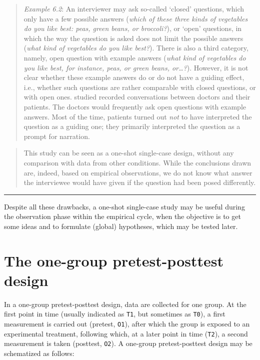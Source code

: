 \documentclass[
]{book}
\begin{document}
\begin{quote}
\emph{Example 6.2}: An interviewer may ask so-called `closed' questions, which only have a few possible answers (\emph{which of these three kinds of vegetables do you like best: peas, green beans, or broccoli?}), or `open' questions, in which the way the question is asked does not limit the possible answers (\emph{what kind of vegetables do you like best?}). There is also a third category, namely, open question with example answers (\emph{what kind of vegetables do you like best, for instance, peas, or green beans, or\ldots?}). However, it is not clear whether these example answers do or do not have a guiding effect, i.e., whether such questions are rather comparable with closed questions, or with open ones. \citet{Houtk91} studied recorded conversations between doctors and their patients. The doctors would frequently ask open questions with example answers. Most of the time, patients turned out \emph{not} to have interpreted the question as a guiding one; they primarily interpreted the question as a prompt for narration.
\end{quote}

\begin{quote}
This study can be seen as a one-shot single-case design, without any comparison with data from other conditions. While the conclusions drawn are, indeed, based on empirical observations, we do not know what answer the interviewee would have given if the question had been posed differently.
\end{quote}

\begin{center}\rule{0.5\linewidth}{0.5pt}\end{center}

Despite all these drawbacks, a one-shot single-case study may be useful during the observation phase within the empirical cycle, when the objective is to get some ideas and to formulate (global) hypotheses, which may be tested later.

\section{The one-group pretest-posttest design}\label{sec:one-group-pretest-posttest-design}

In a one-group pretest-posttest design, data are collected for one group. At the first point in time (usually indicated as \texttt{T1}, but sometimes as \texttt{T0}), a first measurement is carried out (pretest, \texttt{O1}), after which the group is exposed to an experimental treatment, following which, at a later point in time (\texttt{T2}), a second measurement is taken (posttest, \texttt{O2}). A one-group pretest-posttest design may be schematized as follows:
\end{document}
